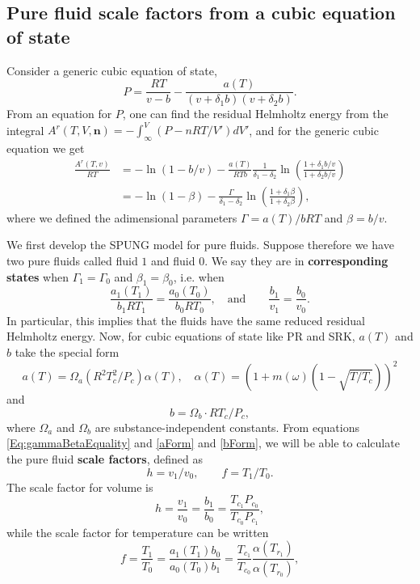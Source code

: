 \documentclass[internal,english]{sintefmemo2012}
\newcommand{\mbn}[0]{\mathbf n}
\newcommand{\lp}{\left(}
\newcommand{\rp}{\right)}
\numberwithin{equation}{section}
\begin{document}
\subsection{Pure fluid scale factors from a cubic equation of state} %
Consider a generic cubic equation of state,
$$
P = \frac{RT}{v-b}-\frac{a(T)}{(v+\delta_1 b)(v+\delta_2 b)}.
$$
From an equation for $P$, one can find the residual Helmholtz energy from the integral
$A^r(T,V,\mbn) = -\int_\infty^V \lp P - nRT/V' \rp dV'$, and for the
generic cubic equation we
get
\begin{align}
  \frac{A^r(T,v)}{RT} &= -\ln(1-b/v)-\frac{a(T)}{RTb}\frac{1}{\delta_1-\delta_2}\ln \lp \frac{1+\delta_1 b/v}{1+\delta_2 b/v} \rp \\[1.5pt]
  &= -\ln(1-\beta) - \frac{\Gamma}{\delta_1-\delta_2} \ln \lp
  \frac{1+\delta_1 \beta}{1+\delta_2 \beta} \rp, \label{Ar_pure}
\end{align}
where we defined the adimensional parameters $\Gamma = a(T)/bRT$ and
$\beta=b/v$.

We first develop the SPUNG model for pure fluids. Suppose therefore we have two pure fluids called fluid $1$ and fluid $0$. We say they are in \textbf{corresponding states} when $\Gamma_1 =
\Gamma_0$ and $\beta_1 = \beta_0$, i.e. when
\begin{equation}
  \label{Eq:gammaBetaEquality}
  \frac{a_1(T_1)}{b_1 R T_1} = \frac{a_0(T_0)}{b_0 R T_0}, \quad \text{and} \qquad \frac{b_1}{v_1} = \frac{b_0}{v_0}.
\end{equation}
In particular, this implies that the fluids have the same reduced residual Helmholtz energy. Now, for cubic equations of state like PR and SRK, $a(T)$ and $b$ take the special form
\begin{equation}
  \label{aForm}
  a(T) = \Omega_a (R^2T_c^2/P_c) \alpha(T), \quad \alpha(T) =\lp 1+m(\omega)(1-\sqrt{T/T_c}) \rp^2 %
\end{equation}
and
\begin{equation}
  \label{bForm}
  b = \Omega_b \cdot RT_c/P_c,
\end{equation}
where $\Omega_a$ and $\Omega_b$ are substance-independent constants. From equations \eqref{Eq:gammaBetaEquality} and \eqref{aForm} and \eqref{bForm}, we will be able to calculate the pure
fluid \textbf{scale factors}, defined as
$$
h = v_1/v_0, \qquad f =
T_1/T_0. %
$$
The scale factor for volume is
\begin{equation}
  \label{eq:h1}
  h = \frac{v_1}{v_0} = \frac{b_1}{b_0} = \frac{T_{c_1}P_{c_0}}{T_{c_0}P_{c_1}},
\end{equation}
while the scale factor for temperature can be written
\begin{equation}
  \label{eq:f1}
  f = \frac{T_1}{T_0} = \frac{a_1(T_1) b_0}{a_0(T_0) b_1} = \frac{T_{c_1}}{T_{c_0}} \frac{\alpha(T_{r_1})}{\alpha(T_{r_0})},
\end{equation}
\end{document}
